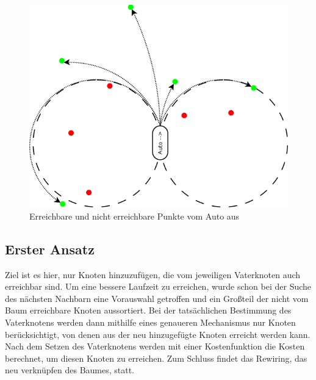 \begin{figure}
	\centering
	\includegraphics[scale=0.6]{Bilder/Erreichbarkeit_Punkte.png}
	\caption{Erreichbare und nicht erreichbare Punkte vom Auto aus}
\end{figure}
\subsection{Erster Ansatz}
Ziel ist es hier, nur Knoten hinzuzufügen, die vom jeweiligen Vaterknoten auch erreichbar sind. Um eine bessere Laufzeit zu erreichen, wurde schon bei der Suche des nächsten Nachbarn eine Vorauswahl getroffen und ein Großteil der nicht vom Baum erreichbare Knoten aussortiert. Bei der tatsächlichen Bestimmung des Vaterknotens werden dann mithilfe eines genaueren Mechanismus nur Knoten berücksichtigt, von denen aus der neu hinzugefügte Knoten erreicht werden kann. \\
Nach dem Setzen des Vaterknotens werden mit einer Kostenfunktion die Kosten berechnet, um diesen Knoten zu erreichen. Zum Schluss findet das Rewiring, das neu verknüpfen des Baumes, statt.
